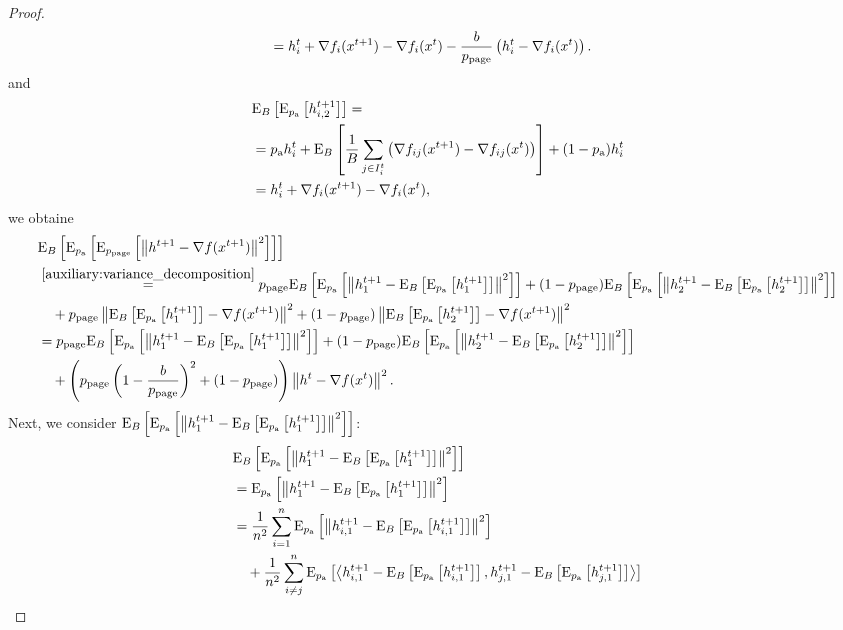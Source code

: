 \documentclass{article}
\begin{document}
\begin{proof}
\begin{align*}
    &= h^t_i + \nabla f_i(x^{t+1}) - \nabla f_i(x^{t}) - \frac{b}{p_{\text{page}}} \left(h^t_i - \nabla f_i(x^{t})\right).
  \end{align*}
  and 
  \begin{align*}
    &{\rm E}_{B}\left[{\rm E}_{p_{\textnormal{a}}}\left[h^{t+1}_{i,2}\right]\right] = \\
    &=p_{\textnormal{a}} h^t_i +  {\rm E}_{B}\left[\frac{1}{B}\sum_{j \in I^t_i}\left(\nabla f_{ij}(x^{t+1}) - \nabla f_{ij}(x^{t})\right)\right] + (1 - p_{\textnormal{a}}) h^t_i \\
    &= h^t_i + \nabla f_i(x^{t+1}) - \nabla f_i(x^{t}),
  \end{align*}
  we obtaine
  \begin{align*}
    &{\rm E}_{B}\left[{\rm E}_{p_{\textnormal{a}}}\left[{\rm E}_{p_{\text{page}}}\left[\left\| h^{t+1} - \nabla f(x^{t+1}) \right\|^2\right]\right]\right] \\
    &\overset{\eqref{auxiliary:variance_decomposition}}{=}p_{\text{page}}{\rm E}_{B}\left[{\rm E}_{p_{\textnormal{a}}}\left[\left\| h^{t+1}_{1} - {\rm E}_{B}\left[{\rm E}_{p_{\textnormal{a}}}\left[h^{t+1}_{1}\right]\right] \right\|^2\right]\right] + (1 - p_{\text{page}}){\rm E}_{B}\left[{\rm E}_{p_{\textnormal{a}}}\left[\left\| h^{t+1}_{2} - {\rm E}_{B}\left[{\rm E}_{p_{\textnormal{a}}}\left[h^{t+1}_{2}\right]\right] \right\|^2\right]\right] \\
    &\quad +p_{\text{page}}\left\| {\rm E}_{B}\left[{\rm E}_{p_{\textnormal{a}}}\left[h^{t+1}_{1}\right]\right] - \nabla f(x^{t+1}) \right\|^2 + (1 - p_{\text{page}})\left\| {\rm E}_{B}\left[{\rm E}_{p_{\textnormal{a}}}\left[h^{t+1}_{2}\right]\right] - \nabla f(x^{t+1}) \right\|^2 \\
    &=p_{\text{page}}{\rm E}_{B}\left[{\rm E}_{p_{\textnormal{a}}}\left[\left\| h^{t+1}_{1} - {\rm E}_{B}\left[{\rm E}_{p_{\textnormal{a}}}\left[h^{t+1}_{1}\right]\right] \right\|^2\right]\right] + (1 - p_{\text{page}}){\rm E}_{B}\left[{\rm E}_{p_{\textnormal{a}}}\left[\left\| h^{t+1}_{2} - {\rm E}_{B}\left[{\rm E}_{p_{\textnormal{a}}}\left[h^{t+1}_{2}\right]\right] \right\|^2\right]\right] \\
    &\quad +\left(p_{\text{page}}\left(1 - \frac{b}{p_{\text{page}}}\right)^2 + (1 - p_{\text{page}})\right)\left\| h^{t} - \nabla f(x^{t}) \right\|^2.
  \end{align*}
  Next, we consider ${\rm E}_{B}\left[{\rm E}_{p_{\textnormal{a}}}\left[\left\| h^{t+1}_{1} - {\rm E}_{B}\left[{\rm E}_{p_{\textnormal{a}}}\left[h^{t+1}_{1}\right]\right] \right\|^2\right]\right]$:
  \begin{align*}
    &\ExpSub{B}{\ExpSub{\probavailable}{\norm{h^{t+1}_{1} - \ExpSub{B}{\ExpSub{\probavailable}{h^{t+1}_{1}}}}^2}}\\
    &=\ExpSub{\probavailable}{\norm{h^{t+1}_{1} - \ExpSub{B}{\ExpSub{\probavailable}{h^{t+1}_{1}}}}^2} \\
    &=\frac{1}{n^2}\sum_{i=1}^n\ExpSub{\probavailable}{\norm{h^{t+1}_{i,1} - \ExpSub{B}{\ExpSub{\probavailable}{h^{t+1}_{i,1}}}}^2} \\
    &\quad +\frac{1}{n^2}\sum_{i\neq j}^n\ExpSub{\probavailable}{\inp{h^{t+1}_{i,1} - \ExpSub{B}{\ExpSub{\probavailable}{h^{t+1}_{i,1}}}}{h^{t+1}_{j,1} - \ExpSub{B}{\ExpSub{\probavailable}{h^{t+1}_{j,1}}}}} \\

\end{align*}
\end{proof}
\end{document}
